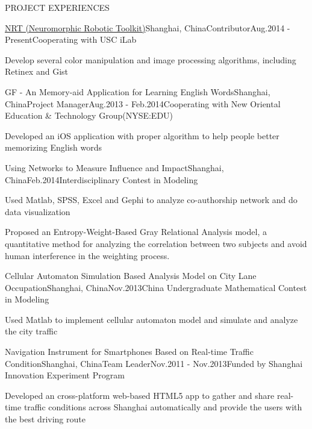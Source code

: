 \documentclass{resume} %
\begin{document}
\begin{rSection}{PROJECT EXPERIENCES}

  \begin{pSubsection}{\href{http://nrtkit.org/}{NRT (Neuromorphic Robotic Toolkit)}}{Shanghai, China}{Contributor}{Aug.2014 - Present}{Cooperating
    with USC iLab}
  \item Develop several color manipulation and image processing algorithms, including Retinex and Gist
  \end{pSubsection}

  \begin{pSubsection}{GF - An Memory-aid Application for Learning English Words}{Shanghai,
    China}{Project Manager}{Aug.2013 - Feb.2014}{Cooperating with New Oriental Education \& Technology Group(NYSE:EDU) }
  \item Developed an iOS application with proper algorithm to help people better memorizing English words
  \end{pSubsection}

  \begin{pSubsection}{Using Networks to Measure Influence and Impact}{Shanghai,
  China}{}{Feb.2014}{Interdisciplinary Contest in Modeling}
  \item Used Matlab, SPSS, Excel and Gephi to analyze co-authorship network and do data visualization
  \item Proposed an Entropy-Weight-Based Gray Relational Analysis model, a quantitative method for
    analyzing the correlation between two subjects and avoid human interference in the
    weighting process.
  \end{pSubsection}

  \begin{pSubsection}{Cellular Automaton Simulation Based Analysis Model
  on City Lane Occupation}{Shanghai,
  China}{}{Nov.2013}{China Undergraduate Mathematical Contest in Modeling}
  \item Used Matlab to implement cellular automaton model and simulate and analyze the city traffic
  \end{pSubsection}

  \begin{pSubsection}{Navigation Instrument for Smartphones Based on Real-time Traffic Condition}{Shanghai,
    China}{Team Leader}{Nov.2011 - Nov.2013}{Funded by Shanghai Innovation Experiment Program}
  \item Developed an cross-platform web-based HTML5 app to gather and share real-time traffic conditions across
    Shanghai automatically and provide the users with the best driving route
  \end{pSubsection}


\end{rSection}
\end{document}
